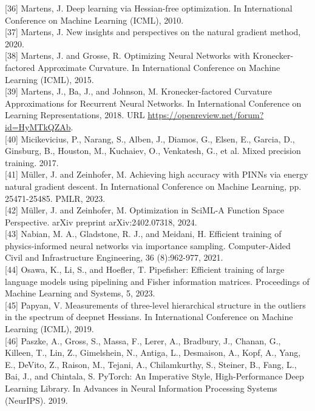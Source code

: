 \documentclass[10pt]{article}
\begin{document}
[36] Martens, J. Deep learning via Hessian-free optimization. In International Conference on Machine Learning (ICML), 2010.\\[0pt]
[37] Martens, J. New insights and perspectives on the natural gradient method, 2020.\\[0pt]
[38] Martens, J. and Grosse, R. Optimizing Neural Networks with Kronecker-factored Approximate Curvature. In International Conference on Machine Learning (ICML), 2015.\\[0pt]
[39] Martens, J., Ba, J., and Johnson, M. Kronecker-factored Curvature Approximations for Recurrent Neural Networks. In International Conference on Learning Representations, 2018. URL \href{https://openreview.net/forum?id=HyMTkQZAb}{https://openreview.net/forum?id=HyMTkQZAb}.\\[0pt]
[40] Micikevicius, P., Narang, S., Alben, J., Diamos, G., Elsen, E., Garcia, D., Ginsburg, B., Houston, M., Kuchaiev, O., Venkatesh, G., et al. Mixed precision training. 2017.\\[0pt]
[41] Müller, J. and Zeinhofer, M. Achieving high accuracy with PINNs via energy natural gradient descent. In International Conference on Machine Learning, pp. 25471-25485. PMLR, 2023.\\[0pt]
[42] Müller, J. and Zeinhofer, M. Optimization in SciML-A Function Space Perspective. arXiv preprint arXiv:2402.07318, 2024.\\[0pt]
[43] Nabian, M. A., Gladstone, R. J., and Meidani, H. Efficient training of physics-informed neural networks via importance sampling. Computer-Aided Civil and Infrastructure Engineering, 36 (8):962-977, 2021.\\[0pt]
[44] Osawa, K., Li, S., and Hoefler, T. Pipefisher: Efficient training of large language models using pipelining and Fisher information matrices. Proceedings of Machine Learning and Systems, 5, 2023.\\[0pt]
[45] Papyan, V. Measurements of three-level hierarchical structure in the outliers in the spectrum of deepnet Hessians. In International Conference on Machine Learning (ICML), 2019.\\[0pt]
[46] Paszke, A., Gross, S., Massa, F., Lerer, A., Bradbury, J., Chanan, G., Killeen, T., Lin, Z., Gimelshein, N., Antiga, L., Desmaison, A., Kopf, A., Yang, E., DeVito, Z., Raison, M., Tejani, A., Chilamkurthy, S., Steiner, B., Fang, L., Bai, J., and Chintala, S. PyTorch: An Imperative Style, High-Performance Deep Learning Library. In Advances in Neural Information Processing Systems (NeurIPS). 2019.\\[0pt]
\end{document}
